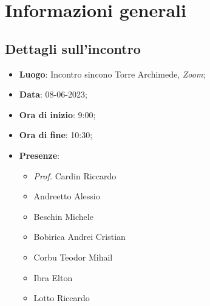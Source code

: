 \section{Informazioni generali}

\subsection{Dettagli sull'incontro}
\begin{itemize}
\item \textbf{Luogo}: Incontro sincono Torre Archimede, \textit{Zoom\glo};
\item \textbf{Data}: 08-06-2023;
\item \textbf{Ora di inizio}: 9:00;
\item \textbf{Ora di fine}: 10:30;
\item \textbf{Presenze}: 
\begin{itemize}
    \item \textit{Prof.} Cardin Riccardo
	\item Andreetto Alessio
    \item Beschin Michele
    \item Bobirica Andrei Cristian
    \item Corbu Teodor Mihail
    \item Ibra Elton
    \item Lotto Riccardo 
\end{itemize}
\end{itemize}


